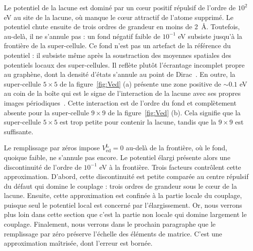 Le potentiel de la lacune est dominé par un c\oe ur positif répulsif de l'ordre de $10^2$ eV au site de la lacune, où manque le c\oe ur attractif de l'atome supprimé. Le potentiel chute ensuite de trois ordres de grandeur en moins de 2~\AA{}. Toutefois, au-delà, il ne s'annule pas : un fond négatif faible de $10^{-1}$ eV subsiste jusqu'à la frontière de la super-cellule. Ce fond n'est pas un artefact de la référence du potentiel : il subsiste même après la soustraction des moyennes spatiales des potentiels locaux des super-cellules. Il reflète plutôt l'écrantage incomplet propre au graphène, dont la densité d'états s'annule au point de Dirac~\cite{castronetoElectronicPropertiesGraphene2009}. En outre, la super-cellule $5\times 5$ de la figure~\ref{fig:Ved} (a) présente une zone positive de $\sim 0.1$ eV au coin de la boîte qui est le signe de l'interaction de la lacune avec ses propres images périodiques~\cite{freysoldtFirstprinciplesCalculationsPoint2014}. Cette interaction est de l'ordre du fond et complètement absente pour la super-cellule $9\times 9$ de la figure~\ref{fig:Ved} (b). Cela signifie que la super-cellule $5\times 5$ est trop petite pour contenir la lacune, tandis que la $9\times 9$ est suffisante.

Le remplissage par zéros impose $V_\text{ed}^\text{L} = 0$ au-delà de la frontière, où le fond, quoique faible, ne s'annule pas encore. Le potentiel élargi présente alors une discontinuité de l'ordre de $10^{-1}$ eV à la frontière. Trois facteurs contrôlent cette approximation. D'abord, cette discontinuité est petite comparée au centre répulsif du défaut qui domine le couplage : trois ordres de grandeur sous le c\oe ur de la lacune. Ensuite, cette approximation est confinée à la partie locale du couplage, puisque seul le potentiel local est concerné par l'élargissement. Or, nous verrons plus loin dans cette section que c'est la partie non locale qui domine largement le couplage. Finalement, nous verrons dans le prochain paragraphe que le remplissage par zéro préserve l'échelle des éléments de matrice. C'est une approximation maîtrisée, dont l'erreur est bornée.


